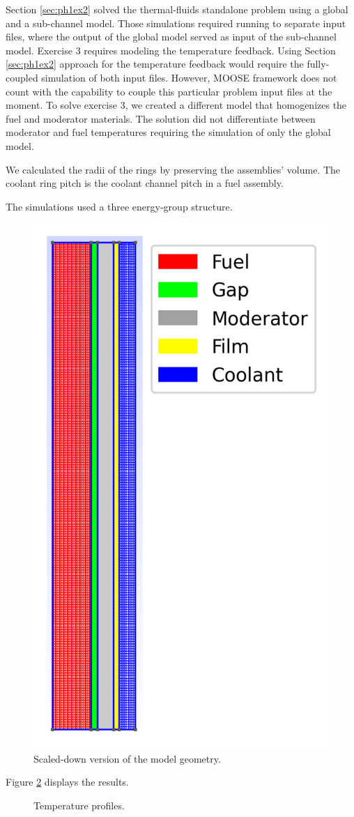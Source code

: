 Section \ref{sec:ph1ex2} solved the thermal-fluids standalone problem using a global and a sub-channel model.
Those simulations required running to separate input files, where the output of the global model served as input of the sub-channel model.
Exercise 3 requires modeling the temperature feedback.
Using Section \ref{sec:ph1ex2} approach for the temperature feedback would require the fully-coupled simulation of both input files.
However, MOOSE framework does not count with the capability to couple this particular problem input files at the moment.
To solve exercise 3, we created a different model that homogenizes the fuel and moderator materials.
The solution did not differentiate between moderator and fuel temperatures requiring the simulation of only the global model.

We calculated the radii of the rings by preserving the assemblies' volume.
The coolant ring pitch is the coolant channel pitch in a fuel assembly.


The simulations used a three energy-group structure.


\begin{figure}[htbp!]
  \centering
  \includegraphics[width=0.25\linewidth]{figures-thermal/2D-preliminar-mesh2}
  \hfill
  \caption{Scaled-down version of the model geometry.}
  \label{fig:th-coupled-mesh}
\end{figure}


Figure \ref{fig:th-coupled-results} displays the results.


\begin{figure}[htbp!]
  \centering
  \hfill
    \caption{Temperature profiles.}
  \label{fig:th-coupled-results}
\end{figure}

